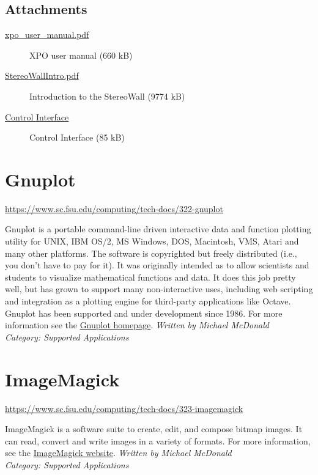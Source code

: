 \documentclass[12pt,a4paper]{article}
\begin{document}
\subsection*{Attachments}
\begin{description}
    \item[\href{https://www.sc.fsu.edu/computing/tech-docs/attachments/306-stereographic-visualization/xpo_user_manual.pdf}{xpo\_user\_manual.pdf}] XPO user manual (660 kB)
    \item[\href{https://www.sc.fsu.edu/computing/tech-docs/attachments/306-stereographic-visualization/StereoWallIntro.pdf}{StereoWallIntro.pdf}] Introduction to the StereoWall (9774 kB)
    \item[\href{https://www.sc.fsu.edu/computing/tech-docs/attachments/306-stereographic-visualization/Control_Interface.jpg}{Control Interface}] Control Interface (85 kB)
\end{description}

\section{Gnuplot}
\url{https://www.sc.fsu.edu/computing/tech-docs/322-gnuplot}

Gnuplot is a portable command-line driven interactive data and function plotting utility for UNIX, IBM OS/2, MS Windows, DOS, Macintosh, VMS, Atari and many other platforms. The software is copyrighted but freely distributed (i.e., you don't have to pay for it). It was originally intended as to allow scientists and students to visualize mathematical functions and data. It does this job pretty well, but has grown to support many non-interactive uses, including web scripting and integration as a plotting engine for third-party applications like Octave. Gnuplot has been supported and under development since 1986. For more information see the \href{http://www.gnuplot.info/}{Gnuplot homepage}.
\hfill \textit{Written by Michael McDonald} \\
\hfill \textit{Category: Supported Applications}

\section{ImageMagick}
\url{https://www.sc.fsu.edu/computing/tech-docs/323-imagemagick}

ImageMagick is a software suite to create, edit, and compose bitmap images. It can read, convert and write images in a variety of formats. For more information, see the \href{https://imagemagick.org/}{ImageMagick website}.
\hfill \textit{Written by Michael McDonald} \\
\hfill \textit{Category: Supported Applications}
\end{document}
